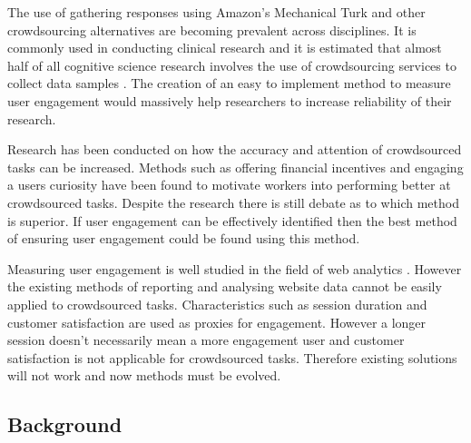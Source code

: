 \documentclass{article}
\begin{document}
The use of gathering responses using Amazon's Mechanical Turk and other crowdsourcing alternatives are becoming prevalent across disciplines.
It is commonly used in conducting clinical research \cite{chandler2016conducting} and it is estimated that almost half of all cognitive science research involves the use of crowdsourcing services to collect data samples \cite{stewart2017crowdsourcing}.
The creation of an easy to implement method to measure user engagement would massively help researchers to increase reliability of their research.

Research has been conducted on how the accuracy and attention of crowdsourced tasks can be increased.
Methods such as offering financial incentives \cite{ho2015incentivizing} and engaging a users curiosity \cite{law2016curiosity} have been found to motivate workers into performing better at crowdsourced tasks.
Despite the research there is still debate as to which method is superior.
If user engagement can be effectively identified then the best method of ensuring user engagement could be found using this method.


Measuring user engagement is well studied in the field of web analytics \cite{peterson2008measuring}.
However the existing methods of reporting and analysing website data cannot be easily applied to crowdsourced tasks.    
Characteristics such as session duration and customer satisfaction are used as proxies for engagement.
However a longer session doesn't necessarily mean a more engagement user and customer satisfaction is not applicable for crowdsourced tasks.
Therefore existing solutions will not work and now methods must be evolved.


\subsection{Background}

\end{document}
